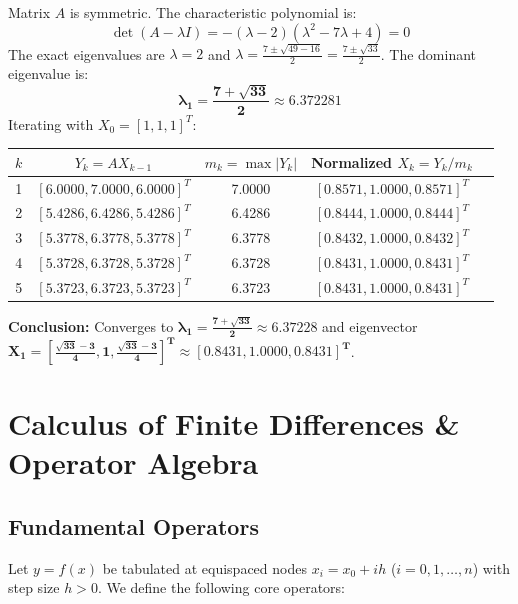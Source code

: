 \documentclass[11pt,a4paper]{article}
\begin{document}
\begin{solbox}
Matrix $A$ is symmetric. The characteristic polynomial is:
$$\det(A - \lambda I) = -(\lambda - 2)(\lambda^2 - 7\lambda + 4) = 0$$
The exact eigenvalues are $\lambda = 2$ and $\lambda = \frac{7 \pm \sqrt{49 - 16}}{2} = \frac{7 \pm \sqrt{33}}{2}$.
The dominant eigenvalue is:
$$\mathbf{\lambda_1 = \frac{7 + \sqrt{33}}{2} \approx 6.372281}$$
Iterating with $X_0 = [1, 1, 1]^T$:
\begin{center}
\small
\begin{tabular}{ccccc}
    \toprule
    $k$ & $Y_k = A X_{k-1}$ & $m_k = \max |Y_k|$ & Normalized $X_k = Y_k / m_k$ \\
    \midrule
    1 & $[6.0000, 7.0000, 6.0000]^T$ & 7.0000 & $[0.8571, 1.0000, 0.8571]^T$ \\
    2 & $[5.4286, 6.4286, 5.4286]^T$ & 6.4286 & $[0.8444, 1.0000, 0.8444]^T$ \\
    3 & $[5.3778, 6.3778, 5.3778]^T$ & 6.3778 & $[0.8432, 1.0000, 0.8432]^T$ \\
    4 & $[5.3728, 6.3728, 5.3728]^T$ & 6.3728 & $[0.8431, 1.0000, 0.8431]^T$ \\
    5 & $[5.3723, 6.3723, 5.3723]^T$ & 6.3723 & $[0.8431, 1.0000, 0.8431]^T$ \\
    \bottomrule
\end{tabular}
\end{center}
\textbf{Conclusion:} Converges to $\mathbf{\lambda_1 = \frac{7 + \sqrt{33}}{2} \approx 6.37228}$ and eigenvector $\mathbf{X_1 = \left[\frac{\sqrt{33}-3}{4}, 1, \frac{\sqrt{33}-3}{4}\right]^T \approx [0.8431, 1.0000, 0.8431]^T}$.
\end{solbox}

\newpage

\section{Calculus of Finite Differences \& Operator Algebra}

\subsection{Fundamental Operators}
Let $y = f(x)$ be tabulated at equispaced nodes $x_i = x_0 + i h$ ($i = 0, 1, \dots, n$) with step size $h > 0$. We define the following core operators:
\end{document}

